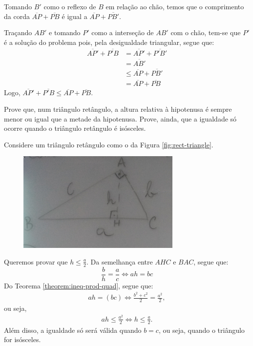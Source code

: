 \begin{solution}
Tomando $B'$ como o reflexo de $B$ em relação ao chão, temos que o comprimento da corda $\overline{AP} + \overline{PB}$ é igual a $\overline{AP} + \overline{PB'}$. 

Traçando $AB'$ e tomando $P'$ como a interseção de $AB'$ com o chão, tem-se que $P'$ é a solução do problema pois, pela desigualdade triangular, segue que:
%
\begin{align*}
\overline{AP'} +\overline{P'B} & = \overline{AP'} +\overline{P'B'} \\
& = \overline{AB'} \\
& \le \overline{AP} +\overline{PB'} \\
& = \overline{AP} +\overline{PB} 
\end{align*}
%
Logo, $\overline{AP'} +\overline{P'B} \le \overline{AP} +\overline{PB}$.
\end{solution}

\begin{example}
Prove que, num triângulo retângulo, a altura relativa à hipotenusa é sempre menor ou igual que a metade da hipotenusa. Prove, ainda, que
a igualdade só ocorre quando o triângulo retângulo é isósceles.
\end{example}

\begin{solution}
Considere um triângulo retângulo como o da Figura \ref{fig:rect-triangle}.
%
\label{fig:rect-triangle}
\begin{figure}[H]
\includegraphics{quadros/09-04/cut1.png}
\centering
\end{figure}
%
Queremos provar que $h \le \frac a 2$. Da semelhança entre $AHC$ e $BAC$, segue que:
%
\begin{equation*} 
\frac b h = \frac a c \iff ah = bc
\end{equation*} 
%
Do Teorema \ref{theorem:ineq-prod-quad}, segue que:
%
\begin{align*}
ah = (bc) \iff \frac {b^2 + c^2} 2 = \frac {a^2} 2,
\end{align*}
%
ou seja, 
%
\begin{align*}
ah \le \frac {a^2} 2 \iff h \le \frac a 2.
\end{align*}
%
Além disso, a igualdade só será válida quando $b=c$, ou seja, quando o triângulo for isósceles.
\end{solution}

